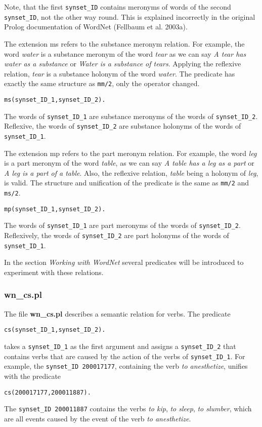 \documentclass[12pt]{article}
\begin{document}
Note, that the first {\tt synset\_ID} contains meronyms of words of the second {\tt synset\_ID}, not the other way round.
This is explained incorrectly in the original Prolog documentation of WordNet (Fellbaum et al. 2003a).

The extension ms refers to the substance meronym relation. For example, the word \emph{water} is a substance meronym
of the word \emph{tear} as we can say \emph{A tear has water as a substance}  or \emph{Water is a substance of tears}.
Applying the reflexive relation, \emph{tear} is a substance holonym of the word \emph{water}.
The predicate has exactly the same structure as {\tt mm/2}, only the operator changed.
\begin{verbatim}
ms(synset_ID_1,synset_ID_2).
\end{verbatim}
The words of {\tt synset\_ID\_1} are substance meronyms of the words of {\tt synset\_ID\_2}.
Reflexive, the words of {\tt synset\_ID\_2} are substance holonyms of the words of {\tt synset\_ID\_1}.

The extension mp refers to the part meronym relation. For example, the word \emph{leg} is a part meronym
of the word \emph{table}, as we can say \emph{A table has a leg as a part} or \emph{A leg is a part of a table}.
Also, the reflexive relation,
\emph{table} being a holonym of \emph{leg}, is valid.
The structure and unification of the predicate is the same as {\tt mm/2} and {\tt ms/2}.
\begin{verbatim}
mp(synset_ID_1,synset_ID_2).
\end{verbatim}
The words of {\tt synset\_ID\_1} are part meronyms of the words of {\tt synset\_ID\_2}.
Reflexively, the words of {\tt synset\_ID\_2} are part holonyms of the words of {\tt synset\_ID\_1}.

In the section \emph{Working with WordNet} several predicates will be introduced to
experiment with these relations.

\subsubsection{wn\_cs.pl}

The file {\bfseries wn\_cs.pl} describes a semantic relation for verbs. The predicate
\begin{verbatim}
cs(synset_ID_1,synset_ID_2).
\end{verbatim}
takes a {\tt synset\_ID\_1} as the first argument and assigns a {\tt synset\_ID\_2} that contains verbs that are caused
by the action of the verbs of {\tt synset\_ID\_1}. For example, the {\tt synset\_ID 200017177}, containing the verb \emph{to anesthetize},
unifies with the predicate
\begin{verbatim}
cs(200017177,200011887).
\end{verbatim}
The {\tt synset\_ID 200011887} contains the verbs \emph{to kip}, \emph{to sleep}, \emph{to slumber},
which are all events caused by the
event of the verb \emph{to anesthetize}.
\end{document}
